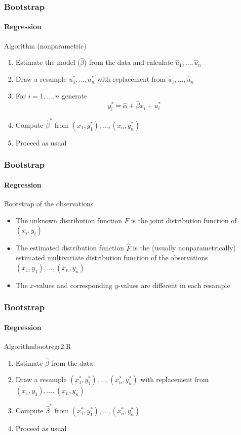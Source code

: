 \documentclass[smaller,compress]{beamer}
\begin{document}
\begin{frame}\frametitle{Bootstrap}\framesubtitle{Regression}
Algorithm (nonparametric)\hspace*{\fill}{\tiny bootregr1.R}
\begin{enumerate}
    \item Estimate the model ($\hat{\beta}$) from the data and calculate $\hat{u}_{1},\ldots ,\hat{u}_{n}$
    \item Draw a resample $u_{1}^{\ast },\ldots ,u_{n}^{\ast }$ with replacement from $\hat{u}_{1},\ldots ,\hat{u}_{n}$
    \item For $i=1,\ldots ,n$ generate
    \begin{equation*}
    y_{i}^{\ast }=\hat{\alpha}+\hat{\beta}x_{i}+u_{i}^{\ast }
    \end{equation*}
    \item Compute $\hat{\beta}^{\ast }$ from $(x_{1},y_{1}^{\ast }),\ldots,\left( x_{n},y_{n}^{\ast }\right) $
    \item Proceed as usual
\end{enumerate}
\end{frame}


\begin{frame}\frametitle{Bootstrap}\framesubtitle{Regression}
Bootstrap of the observations
\begin{itemize}
    \item The unknown distribution function $F$ is the joint distribution function of $(x_{i},y_{i})$
    \item The estimated distribution function $\hat{F}$ is the (usually nonparametrically) estimated multivariate distribution function of the observations $(x_{1},y_{1}),\ldots ,\left( x_{n},y_{n}\right) $
    \item The $x$-values and corresponding $y$-values are different in each resample
\end{itemize}
\end{frame}


\begin{frame}\frametitle{Bootstrap}\framesubtitle{Regression}
Algorithm\hfill {\tiny bootregr2.R}
\begin{enumerate}
    \item Estimate $\hat{\beta}$ from the data
    \item Draw a resample $(x_{1}^{\ast },y_{1}^{\ast }),\ldots ,\left(x_{n}^{\ast },y_{n}^{\ast }\right) $ with replacement from $(x_{1},y_{1}),\ldots ,\left( x_{n},y_{n}\right) $
    \item Compute $\hat{\beta}^{\ast }$ from $(x_{1}^{\ast },y_{1}^{\ast}),\ldots ,\left( x_{n}^{\ast },y_{n}^{\ast }\right) $
    \item Proceed as usual
\end{enumerate}
\end{frame}
\end{document}
